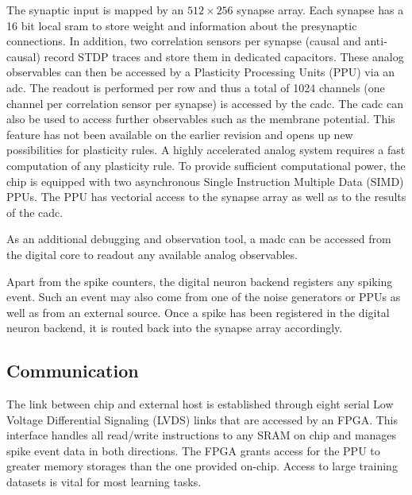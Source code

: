 The synaptic input is mapped by an $512 \times 256$ synapse array. Each synapse has a 16 bit local \gls{sram} to store weight and information about the presynaptic connections. In addition, two correlation sensors per synapse (causal and anti-causal) record STDP traces and store them in dedicated capacitors. These analog observables can then be accessed by a Plasticity Processing Units (PPU) via an \gls{adc}. The readout is performed per row and thus a total of 1024 channels (one channel per correlation sensor per synapse) is accessed by the \gls{cadc}. The \gls{cadc} can also be used to access further observables such as the membrane potential. This feature has not been available on the earlier revision and opens up new possibilities for plasticity rules. A highly accelerated analog system requires a fast computation of any plasticity rule. To provide sufficient computational power, the chip is equipped with two asynchronous Single Instruction Multiple Data (SIMD) PPUs. The PPU has vectorial access to the synapse array as well as to the results of the \gls{cadc}.   

As an additional debugging and observation tool, a \gls{madc} can be accessed from the digital core to readout any available analog observables.

Apart from the spike counters, the digital neuron backend registers any spiking event. Such an event may also come from one of the noise generators or PPUs as well as from an external source. Once a spike has been registered in the digital neuron backend, it is routed back into the synapse array accordingly. 

\subsection{Communication}
The link between chip and external host is established through eight serial Low Voltage Differential Signaling (LVDS) links that are accessed by an FPGA. This interface handles all read/write instructions to any SRAM on chip and manages spike event data in both directions. The FPGA grants access for the PPU to greater memory storages than the one provided on-chip. Access to large training datasets is vital for most learning tasks.

